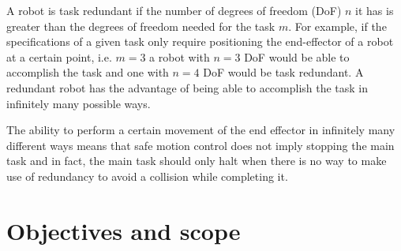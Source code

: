 A robot is task redundant if the number of degrees of freedom (DoF) $n$ it has is greater than the degrees of freedom needed for the task $m$. For example, if the specifications of a given task only require positioning the end-effector of a robot at a certain point, i.e. $m = 3$ a robot with $n = 3$ DoF would be able to accomplish the task and one with $n = 4$ DoF would be task redundant. A redundant robot has the advantage of being able to accomplish the task in infinitely many possible ways.

The ability to perform a certain movement of the end effector in infinitely many different ways means that safe motion control does not imply stopping the main task and in fact, the main task should only halt when there is no way to make use of redundancy to avoid a collision while completing it.

\section{Objectives and scope}
